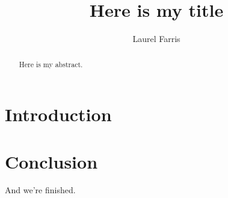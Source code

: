 \documentclass[preprint2]{aastex}
\begin{document}
\title{Here is my title}
\author{Laurel Farris}

\begin{abstract}
Here is my abstract.
\end{abstract}

\section{Introduction}

\section{Conclusion}
And we're finished.
\end{document}
